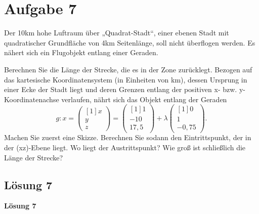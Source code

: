 \section{Aufgabe 7}

Der 10km hohe Luftraum über „Quadrat-Stadt“, einer ebenen Stadt mit quadratischer Grundfläche von 4km Seitenlänge, soll nicht überflogen werden. Es nähert sich ein Flugobjekt entlang einer Geraden. 

Berechnen Sie die Länge der Strecke, die es in der Zone zurücklegt. Bezogen auf das kartesische Koordinatensystem (in Einheiten von km), dessen Ursprung in einer Ecke der Stadt liegt und deren Grenzen entlang der positiven x- bzw. y-Koordinatenachse verlaufen, nährt sich das Objekt entlang der Geraden
\begin{equation*}
	g:x=\begin{pmatrix}[1]
		x\\
		y\\
		z
	\end{pmatrix} =\begin{pmatrix}[1]
		1\\
		-10\\
		17,5
	\end{pmatrix} +\lambda \begin{pmatrix}[1]
		0\\
		1\\
		-0,75
	\end{pmatrix}\text{.}
\end{equation*}
Machen Sie zuerst eine Skizze. Berechnen Sie sodann den Eintrittspunkt, der in der (xz)-Ebene liegt. Wo liegt der Austrittspunkt? Wie groß ist schließlich die Länge der Strecke?

\subsection{Lösung 7}

\textbf{Lösung 7}



